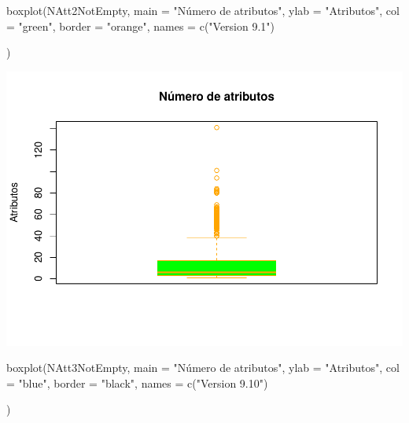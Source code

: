 \documentclass[
]{article}
\newenvironment{Shaded}{\begin{snugshade}}{\end{snugshade}}
\newcommand{\AttributeTok}[1]{\textcolor[rgb]{0.77,0.63,0.00}{#1}}
\newcommand{\FunctionTok}[1]{\textcolor[rgb]{0.00,0.00,0.00}{#1}}
\newcommand{\NormalTok}[1]{#1}
\newcommand{\StringTok}[1]{\textcolor[rgb]{0.31,0.60,0.02}{#1}}
\begin{document}
\begin{Shaded}
\begin{Highlighting}[]
  \FunctionTok{boxplot}\NormalTok{(NAtt2NotEmpty,}
        \AttributeTok{main =} \StringTok{"Número de atributos"}\NormalTok{,}
        \AttributeTok{ylab =} \StringTok{"Atributos"}\NormalTok{,}
        \AttributeTok{col =} \StringTok{"green"}\NormalTok{,}
        \AttributeTok{border =} \StringTok{"orange"}\NormalTok{,}
        \AttributeTok{names =} \FunctionTok{c}\NormalTok{(}\StringTok{"Version 9.1"}\NormalTok{)}
        
\NormalTok{        )}
\end{Highlighting}
\end{Shaded}

\includegraphics{report_files/figure-latex/unnamed-chunk-10-2.pdf}

\begin{Shaded}
\begin{Highlighting}[]
 \FunctionTok{boxplot}\NormalTok{(NAtt3NotEmpty,}
        \AttributeTok{main =} \StringTok{"Número de atributos"}\NormalTok{,}
        \AttributeTok{ylab =} \StringTok{"Atributos"}\NormalTok{,}
        \AttributeTok{col =} \StringTok{"blue"}\NormalTok{,}
        \AttributeTok{border =} \StringTok{"black"}\NormalTok{,}
        \AttributeTok{names =} \FunctionTok{c}\NormalTok{(}\StringTok{"Version 9.10"}\NormalTok{)}
        
\NormalTok{        )}
\end{Highlighting}
\end{Shaded}
\end{document}
